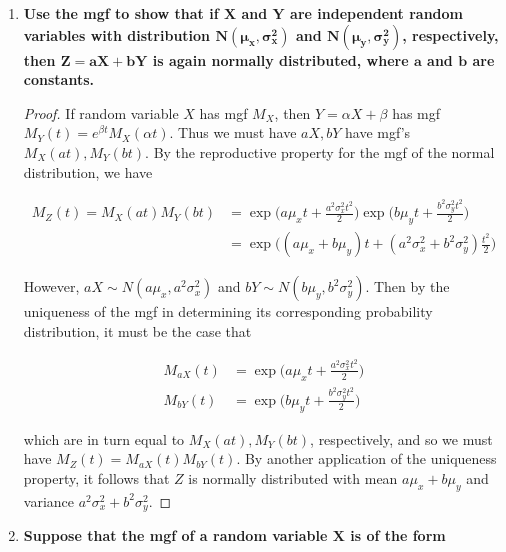\documentclass[10pt, oneside]{article}   	%
\theoremstyle{definition}
\begin{document}
\begin{enumerate}[label=10.\arabic*]
\begin{enumerate}
	\end{enumerate}

\item  \begin{tcolorbox}[
  colback=Cerulean!5!white,
  colframe=Cerulean!75!black]
\textbf{Use the mgf to show that if $\bm{X}$ and $\bm{Y}$ are independent random variables with distribution $\bm{N(\mu_x, \sigma^2_x)}$ and $\bm{N(\mu_y, \sigma^2_y)}$, respectively, then $\bm{Z = aX + bY}$ is again normally distributed, where $\bm{a}$ and $\bm{b}$ are constants.}
\end{tcolorbox}

\begin{proof}
If random variable $X$ has mgf $M_X$, then $Y = \alpha X + \beta$ has mgf $M_Y(t) = e^{\beta t} M_X (\alpha t)$. Thus we must have $aX, bY$ have mgf's $M_X(at), M_Y(bt)$. By the reproductive property for the mgf of the normal distribution, we have

\begin{align*} 
M_Z(t) = M_X(at) M_Y(bt) &= \exp \bigg( a\mu_x t + \frac{a^2 \sigma^2_x t^2}{2} \bigg) \exp \bigg( b\mu_y t + \frac{b^2 \sigma^2_y t^2}{2} \bigg) \\
&= \exp \bigg( (a\mu_x + b\mu_y) t + (a^2 \sigma^2_x + b^2 \sigma^2_y) \frac{t^2}{2} \bigg)
\end{align*}

However, $aX \sim N(a\mu_x, a^2 \sigma^2_x)$ and $bY \sim N(b\mu_y, b^2 \sigma^2_y)$. Then by the uniqueness of the mgf in determining its corresponding probability distribution, it must be the case that

\begin{align*}
M_{aX} (t) &= \exp \bigg( a\mu_x t + \frac{a^2 \sigma^2_x t^2}{2} \bigg) \\
M_{bY} (t) &= \exp \bigg( b\mu_y t + \frac{b^2 \sigma^2_y t^2}{2} \bigg)
\end{align*}

which are in turn equal to $M_X(at), M_Y(bt)$, respectively, and so we must have $M_Z(t) = M_{aX} (t) M_{bY}(t)$. By another application of the uniqueness property, it follows that $Z$ is normally distributed with mean $\boxed{a\mu_x + b\mu_y}$ and variance $\boxed{a^2 \sigma^2_x + b^2 \sigma^2_y}$.

\end{proof}

\item  \begin{tcolorbox}[
  colback=Cerulean!5!white,
  colframe=Cerulean!75!black]
\textbf{Suppose that the mgf of a random variable $\bm{X}$ is of the form}


\end{tcolorbox}
\end{enumerate}
\end{document}
